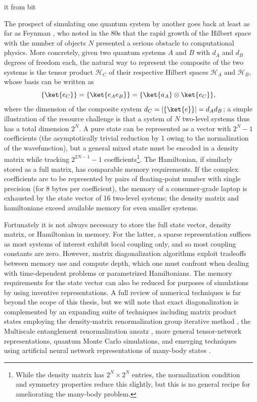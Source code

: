 	it from bit

	The prospect of simulating one quantum system by another goes back at least as far as Feynman \cite{feynman82}, who noted in the 80s that the rapid growth of the Hilbert space with the number of objects $N$ presented a serious obstacle to computational physics.
	More concretely, given two quantum systems $A$ and $B$ with $d_A$ and $d_B$ degrees of freedom each, the natural way to represent the composite of the two systems is the tensor product $\mathcal{H}_C$ of their respective Hilbert spaces $\mathcal{H}_A$ and $\mathcal{H}_B$, whose basis can be written as
	\begin{equation}
		\{\ket{e_C}\} = \{\ket{e_A e_B}\} = \{\ket{a_A}\otimes\ket{e_C}\},
	\end{equation}
	where the dimension of the composite system $d_C = |\{\ket{e}\}| = d_A d_B$; a simple illustration of the resource challenge is that a system of $N$ two-level systems thus has a total dimension $2^N$.
	A pure state can be represented as a vector with $2^N-1$ coefficients (the asymptotically trivial reduction by 1 owing to the normalization of the wavefunction), but a general mixed state must be encoded in a density matrix while tracking $2^{2N-1}-1$  coefficients\footnote{While the density matrix has $2^N\times2^N$ entries, the normalization condition and symmetry properties reduce this slightly, but this is no general recipe for ameliorating the many-body problem.}.
	The Hamiltonian, if similarly stored as a full matrix, has comparable memory requirements.
	If the complex coefficients are to be represented by pairs of floating-point number with single precision (for 8 bytes per coefficient), the memory of a consumer-grade laptop is exhausted by the state vector of 16 two-level systems; the density matrix and hamiltoniane exceed available memory for even smaller systems.
	

	Fortunately it is not always necessary to store the full state vector, density matrix, or Hamiltonian in memory.
	For the latter, a sparse representation suffices as most systems of interest exhibit local coupling only, and so most coupling constants are zero.
	However, matrix diagonalization algorithms exploit tradeoffs between memory use and compute depth, which one must confront when dealing with time-dependent problems or parametrized Hamiltonians.
	The memory requirements for the state vector can also be reduced for purposes of simulations by using inventive representations.
	A full review of numerical techniques is far beyond the scope of this thesis, but we will note that exact diagonalization \cite{zhang10} is complemented by an expanding suite of techniques including matrix product states \cite{schollwoeck11} employing the density-matrix renormalization group iterative method \cite{dechiara08}, the Multiscale entanglement renormalization ansatz \cite{}, more general tensor-network representations, quantum Monte Carlo simulations, and emerging techniques using artificial neural network representations of many-body states \cite{}.
	

